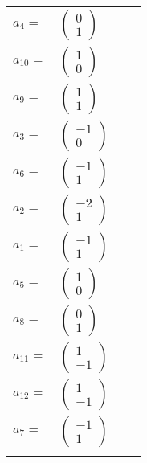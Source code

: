 \documentclass[1p]{elsarticle_modified}
\theoremstyle{definition}
\begin{document}
\begin{tabular}{m{7pt} m{180pt} m{7pt} m{180pt} }
\flushright $a_{4}=$&$\begin{pmatrix}0\\1\end{pmatrix}$ \\
\flushright $a_{10}=$&$\begin{pmatrix}1\\0\end{pmatrix}$ \\
\flushright $a_{9}=$&$\begin{pmatrix}1\\1\end{pmatrix}$ \\
\flushright $a_{3}=$&$\begin{pmatrix}-1\\0\end{pmatrix}$ \\
\flushright $a_{6}=$&$\begin{pmatrix}-1\\1\end{pmatrix}$ \\
\flushright $a_{2}=$&$\begin{pmatrix}-2\\1\end{pmatrix}$ \\
\flushright $a_{1}=$&$\begin{pmatrix}-1\\1\end{pmatrix}$ \\
\flushright $a_{5}=$&$\begin{pmatrix}1\\0\end{pmatrix}$ \\
\flushright $a_{8}=$&$\begin{pmatrix}0\\1\end{pmatrix}$ \\
\flushright $a_{11}=$&$\begin{pmatrix}1\\-1\end{pmatrix}$ \\
\flushright $a_{12}=$&$\begin{pmatrix}1\\-1\end{pmatrix}$ \\
\flushright $a_{7}=$&$\begin{pmatrix}-1\\1\end{pmatrix}$\\&\end{tabular}
\end{document}
